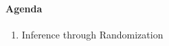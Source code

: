 \documentclass[10pt]{article}\usepackage[]{graphicx}\usepackage[]{color}
\begin{document}
\paragraph{Agenda}
\begin{enumerate}
  \itemsep0em
  \item Inference through Randomization
\end{enumerate}

% 
% 
% 
% 
\end{document}
